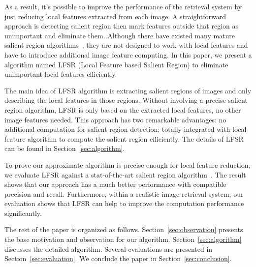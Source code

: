 As a result, it's possible to improve the performance of the retrieval system by just reducing local features extracted from each image. A straightforward approach is detecting salient region then mark features outside that region as unimportant and eliminate them. Although there have existed many mature salient region algorithms~\cite{cheng2011global,achanta2009frequency,itti1998model}, they are not designed to work with local features and have to introduce additional image feature computing. In this paper, we present a algorithm named LFSR (Local Feature based Salient Region) to eliminate unimportant local features efficiently.

The main idea of LFSR algorithm is extracting salient regions of images and only describing the local features in those regions. Without involving a precise salient region algorithm, LFSR is only based on the extracted local features, no other image features needed. This approach has two remarkable advantages: no additional computation for salient region detection; totally integrated with local feature algorithm to compute the salient region efficiently. The details of LFSR can be found in Section~\ref{sec:algorithm}. 

To prove our approximate algorithm is precise enough for local feature reduction, we evaluate LFSR against a stat-of-the-art salient region algorithm~\cite{achanta2009frequency}. The result shows that our approach has a much better performance with compatible precision and recall. Furthermore, within a realistic image retrieval system, our evaluation shows that LFSR can help to improve the computation performance significantly.

The rest of the paper is organized as follows. Section~\ref{sec:observation} presents the base motivation and observation for our algorithm. Section~\ref{sec:algorithm} discusses the detailed algorithm. Several evaluations are presented in Section~\ref{sec:evaluation}. We conclude the paper in Section~\ref{sec:conclusion}.
